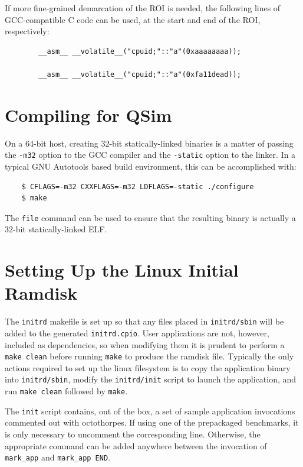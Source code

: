\documentclass[letterpaper, 10pt]{book}
\begin{document}
If more fine-grained demarcation of the ROI is needed, the following lines of
GCC-compatible C code can be used, at the start and end of the ROI,
respectively:

\begin{verbatim}
        __asm__ __volatile__("cpuid;"::"a"(0xaaaaaaaa));

        __asm__ __volatile__("cpuid;"::"a"(0xfa11dead));
\end{verbatim}

\section{Compiling for QSim}
On a 64-bit host, creating 32-bit statically-linked binaries is a matter of 
passing the \texttt{-m32} option to the GCC compiler and the \texttt{-static}
option to the linker. In a typical GNU Autotools based build environment, this
can be accomplished with:

\begin{verbatim}
    $ CFLAGS=-m32 CXXFLAGS=-m32 LDFLAGS=-static ./configure
    $ make
\end{verbatim}

The \texttt{file} command can be used to ensure that the resulting binary is
actually a 32-bit statically-linked ELF.

\section{Setting Up the Linux Initial Ramdisk}
The \texttt{initrd} makefile is set up so that any files placed in 
\texttt{initrd/sbin} will be added to the generated \texttt{initrd.cpio}. User
applications are not, however, included as dependencies, so when modifying them
it is prudent to perform a \texttt{make clean} before running \texttt{make} to
produce the ramdisk file. Typically the only actions required to set up the
linux filesystem is to copy the application binary into \texttt{initrd/sbin},
modify the \texttt{initrd/init} script to launch the application, and run
\texttt{make clean} followed by \texttt{make}.

The \texttt{init} script contains, out of the box, a set of sample application
invocations commented out with octothorpes. If using one of the prepackaged
benchmarks, it is only necessary to uncomment the corresponding line. 
Otherwise, the appropriate command can be added anywhere between the invocation
of \texttt{mark\_app} and \texttt{mark\_app END}.
\end{document}
